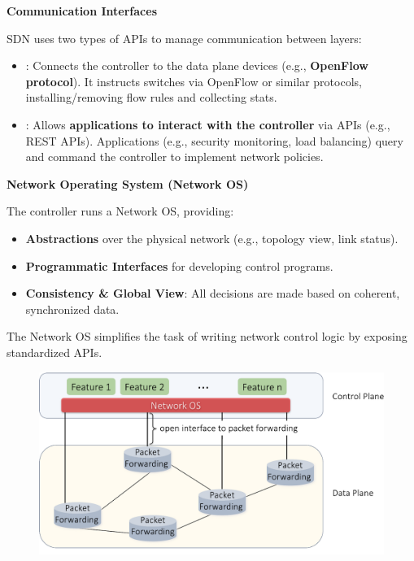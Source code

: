 \highspace
\begin{flushleft}
    \textcolor{Green3}{ \textbf{Communication Interfaces}}
\end{flushleft}
SDN uses two types of APIs to manage communication between layers:
\begin{itemize}
    \item {}: Connects the controller to the data plane devices (e.g., \textbf{OpenFlow protocol}). It instructs switches via OpenFlow or similar protocols, installing/removing flow rules and collecting stats.
    \item {}: Allows \textbf{applications to interact with the controller} via APIs (e.g., REST APIs). Applications (e.g., security monitoring, load balancing) query and command the controller to implement network policies.
\end{itemize}

\highspace
\begin{flushleft}
    \textcolor{Green3}{ \textbf{Network Operating System (Network OS)}}
\end{flushleft}
The controller runs a Network OS, providing:
\begin{itemize}
    \item \textbf{Abstractions} over the physical network (e.g., topology view, link status).
    \item \textbf{Programmatic Interfaces} for developing control programs.
    \item \textbf{Consistency \& Global View}: All decisions are made based on coherent, synchronized data.
\end{itemize}
The Network OS simplifies the task of writing network control logic by exposing standardized APIs.

\begin{figure}[!htp]
    \centering
    \includegraphics[width=\textwidth]{img/sdn-arch.pdf}
\end{figure}


